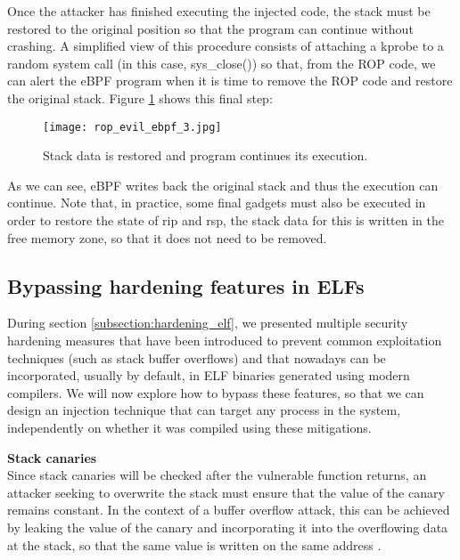 Once the attacker has finished executing the injected code, the stack must be restored to the original position so that the program can continue without crashing. A simplified view of this procedure consists of attaching a kprobe to a random system call (in this case, sys\_close()) so that, from the ROP code, we can alert the eBPF program when it is time to remove the ROP code and restore the original stack. Figure \ref{fig:rop_evil_ebpf_3} shows this final step:

\begin{figure}[H]
	\centering
	\texttt{[image: rop\_evil\_ebpf\_3.jpg]}
	\caption{Stack data is restored and program continues its execution.}
	\label{fig:rop_evil_ebpf_3}
\end{figure}

As we can see, eBPF writes back the original stack and thus the execution can continue. Note that, in practice, some final gadgets must also be executed in order to restore the state of rip and rsp, the stack data for this is written in the free memory zone, so that it does not need to be removed.


\subsection{Bypassing hardening features in ELFs} \label{subsection:hardening_bypass}
During section \ref{subsection:hardening_elf}, we presented multiple  security hardening measures that have been introduced to prevent common exploitation techniques (such as stack buffer overflows) and that nowadays can be incorporated, usually by default, in ELF binaries generated using modern compilers. We will now explore how to bypass these features, so that we can design an injection technique that can target any process in the system, independently on whether it was compiled using these mitigations.

\textbf{Stack canaries}\\
Since stack canaries will be checked after the vulnerable function returns, an attacker seeking to overwrite the stack must ensure that the value of the canary remains constant. In the context of a buffer overflow attack, this can be achieved by leaking the value of the canary and incorporating it into the overflowing data at the stack, so that the same value is written on the same address \cite{canary_exploit}.

